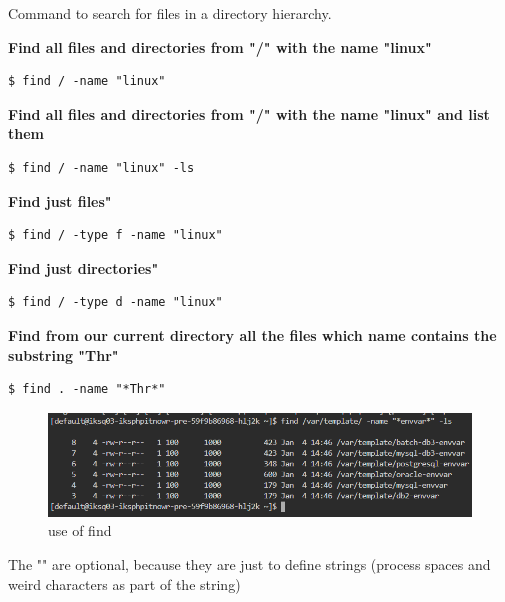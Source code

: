 \documentclass{article}
\newenvironment{blocktemplateII}[1]{%
    \tcolorbox[beamer,%
    noparskip,breakable,
    colframe=Green,%
    colbacklower=LimeGreen!75!LightGreen,%
    title=#1]}%
    {\endtcolorbox}
\newenvironment{codetemplate}[1][]{%
  \mybasecolorbox[#1]
  \itshape
}{%
  \endmybasecolorbox
}
\begin{document}
Command to search for files in a directory hierarchy.


\textbf{Find all files and directories from "/" with the name "linux"}
\begin{codetemplate}{}
\begin{verbatim}
$ find / -name "linux"
\end{verbatim}
\end{codetemplate}

\textbf{Find all files and directories from "/" with the name "linux" and list them}
\begin{codetemplate}{}
\begin{verbatim}
$ find / -name "linux" -ls
\end{verbatim}
\end{codetemplate}

\textbf{Find just files"}
\begin{codetemplate}{}
\begin{verbatim}
$ find / -type f -name "linux"
\end{verbatim}
\end{codetemplate}

\textbf{Find just directories"}
\begin{codetemplate}{}
\begin{verbatim}
$ find / -type d -name "linux"
\end{verbatim}
\end{codetemplate}

\textbf{Find from our current directory all the files which name contains the substring "Thr"}
\begin{codetemplate}{}
\begin{verbatim}
$ find . -name "*Thr*" 
\end{verbatim}
\end{codetemplate}

\begin{figure}[H]
    \centering
    \includegraphics[scale=0.7]{pictures/image3.png}
    \caption{use of find}
\end{figure}

\begin{blocktemplateII}{NOTE}
The "" are optional, because they are just to define strings (process spaces and weird characters as part of the string)
\end{blocktemplateII}
\end{document}
